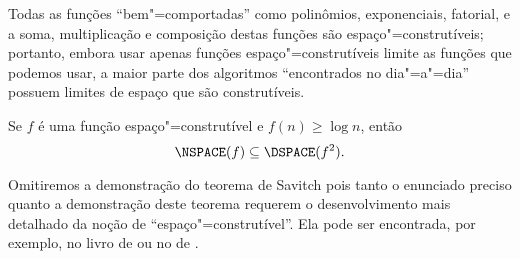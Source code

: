 Todas as funções ``bem"=comportadas'' como polinômios,
exponenciais, fatorial, e a soma, multiplicação e composição destas funções
são espaço"=construtíveis;
portanto,
embora usar apenas funções espaço"=construtíveis limite
as funções que podemos usar,
a maior parte dos algoritmos ``encontrados no dia"=a"=dia''
possuem limites de espaço que são construtíveis.

\begin{utheorem}
    Se $f$ é uma função espaço"=construtível e $f(n) \geq \log n$,
    então
    \begin{equation*}
        \NSPACE(f) \subseteq \DSPACE(f^2).
    \end{equation*}
\end{utheorem}

Omitiremos a demonstração do teorema de Savitch
pois tanto o enunciado preciso quanto a demonstração deste teorema
requerem o desenvolvimento mais detalhado da noção de
``espaço"=construtível''.
Ela pode ser encontrada, por exemplo,
no livro de 
ou no de .
